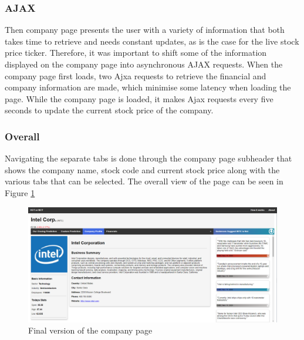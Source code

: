             \subsubsection{AJAX} Then company page presents the user with a variety of information that both takes time to retrieve and needs constant updates, as is the case for the live stock price ticker. Therefore, it was important to shift some of the information displayed on the company page into asynchronous AJAX requests. When the company page first loads, two Ajxa requests to retrieve the financial and company information are made, which minimise some latency when loading the page. While the company page is loaded, it makes Ajax requests every five seconds to update the current stock price of the company. 
            
            \subsubsection{Overall}
            Navigating the separate tabs is done through the company page subheader that shows the company name, stock code and current stock price along with the various tabs that can be selected. The overall view of the page can be seen in Figure \ref{fig:Home_final}
            
            \begin{figure}[!h]
                \centering
                \includegraphics[width=0.9\linewidth]{images/upload/Comp_final.PNG}
                \caption{Final version of the company page}
                \label{fig:Home_final}
            \end{figure}
            
    

